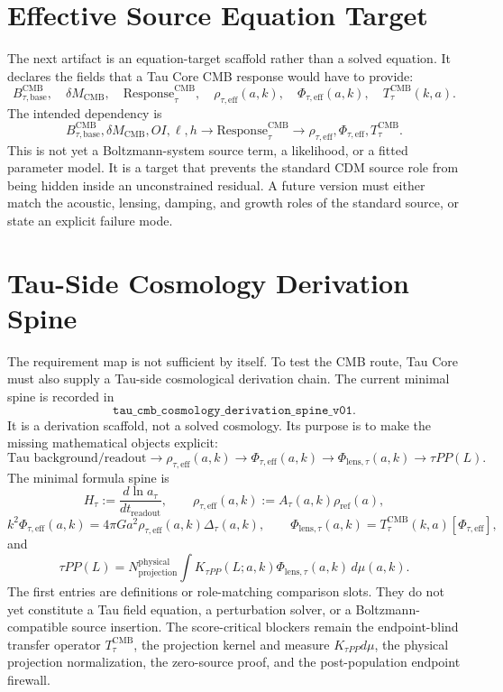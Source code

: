 \documentclass[11pt]{article}
\begin{document}
\section{Effective Source Equation Target}

The next artifact is an equation-target scaffold rather than a solved equation.
It declares the fields that a Tau Core CMB response would have to provide:
\[
B_{\tau,\mathrm{base}}^{\mathrm{CMB}},\quad
\delta M_{\mathrm{CMB}},\quad
\mathrm{Response}_{\tau}^{\mathrm{CMB}},\quad
\rho_{\tau,\mathrm{eff}}(a,k),\quad
\Phi_{\tau,\mathrm{eff}}(a,k),\quad
T_{\tau}^{\mathrm{CMB}}(k,a).
\]
The intended dependency is
\[
B_{\tau,\mathrm{base}}^{\mathrm{CMB}},\delta M_{\mathrm{CMB}},OI,\ell,h
\longrightarrow
\mathrm{Response}_{\tau}^{\mathrm{CMB}}
\longrightarrow
\rho_{\tau,\mathrm{eff}},\Phi_{\tau,\mathrm{eff}},T_{\tau}^{\mathrm{CMB}}.
\]
This is not yet a Boltzmann-system source term, a likelihood, or a fitted
parameter model. It is a target that prevents the standard CDM source role from
being hidden inside an unconstrained residual. A future version must either
match the acoustic, lensing, damping, and growth roles of the standard source,
or state an explicit failure mode.

\section{Tau-Side Cosmology Derivation Spine}

The requirement map is not sufficient by itself. To test the CMB route, Tau
Core must also supply a Tau-side cosmological derivation chain. The current
minimal spine is recorded in
\[
\texttt{tau\_cmb\_cosmology\_derivation\_spine\_v01}.
\]
It is a derivation scaffold, not a solved cosmology. Its purpose is to make the
missing mathematical objects explicit:
\[
\text{Tau background/readout}
\longrightarrow
\rho_{\tau,\mathrm{eff}}(a,k)
\longrightarrow
\Phi_{\tau,\mathrm{eff}}(a,k)
\longrightarrow
\Phi_{\mathrm{lens},\tau}(a,k)
\longrightarrow
\tau PP(L).
\]
The minimal formula spine is
\[
H_{\tau}:=\frac{d\ln a_{\tau}}{d t_{\mathrm{readout}}},
\qquad
\rho_{\tau,\mathrm{eff}}(a,k):=A_{\tau}(a,k)\rho_{\mathrm{ref}}(a),
\]
\[
k^2\Phi_{\tau,\mathrm{eff}}(a,k)
=
4\pi G a^2\rho_{\tau,\mathrm{eff}}(a,k)\Delta_{\tau}(a,k),
\qquad
\Phi_{\mathrm{lens},\tau}(a,k)
=
T_{\tau}^{\mathrm{CMB}}(k,a)[\Phi_{\tau,\mathrm{eff}}],
\]
and
\[
\tau PP(L)
=
N_{\mathrm{projection}}^{\mathrm{physical}}
\int K_{\tau PP}(L;a,k)\Phi_{\mathrm{lens},\tau}(a,k)\,d\mu(a,k).
\]
The first entries are definitions or role-matching comparison slots. They do
not yet constitute a Tau field equation, a perturbation solver, or a
Boltzmann-compatible source insertion. The score-critical blockers remain the
endpoint-blind transfer operator $T_{\tau}^{\mathrm{CMB}}$, the projection
kernel and measure $K_{\tau PP}d\mu$, the physical projection normalization,
the zero-source proof, and the post-population endpoint firewall.
\end{document}
